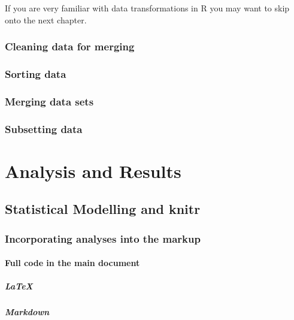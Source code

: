 \documentclass[ChapterTOCs,krantz1]{krantz}\usepackage{graphicx, color}
\begin{document}
If you are very familiar with data transformations in R you may want to skip onto the next chapter. 

\section{Cleaning data for merging}

\section{Sorting data}

\section{Merging data sets}

\section {Subsetting data}



\part{Analysis and Results}





\chapter{Statistical Modelling and knitr} \label{StatsModel}

\section{Incorporating analyses into the markup}

\subsection{Full code in the main document}

\subsubsection{\LaTeX  }

\subsubsection{Markdown}
\end{document}
